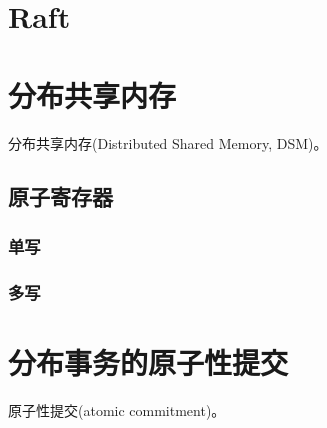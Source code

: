 \chapter{Raft}


\chapter{分布共享内存}

分布共享内存(Distributed Shared Memory, DSM)。



\section{原子寄存器}

\subsection{单写}

\subsection{多写}


\chapter{分布事务的原子性提交}

原子性提交(atomic commitment)。
